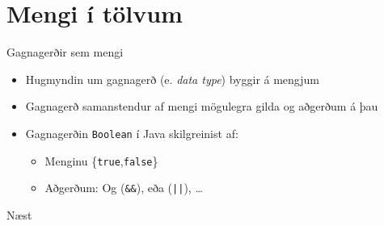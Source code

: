 \documentclass[handout]{beamer}
\begin{document}
\section{Mengi í tölvum}

\begin{frame}[fragile]{Gagnagerðir sem mengi}
 \begin{itemize}
  \item Hugmyndin um gagnagerð (e. \emph{data type}) byggir á mengjum
  \item Gagnagerð samanstendur af mengi mögulegra gilda og aðgerðum á þau
  \item Gagnagerðin \texttt{Boolean} í Java skilgreinist af:
  \begin{itemize}
   \item Menginu \{\texttt{true},\texttt{false}\}
   \item Aðgerðum: Og (\verb|&&|), eða (\verb&||&), \ldots
  \end{itemize}
 \end{itemize}
\end{frame}

\begin{frame}{Næst}

\end{frame}
\end{document}
